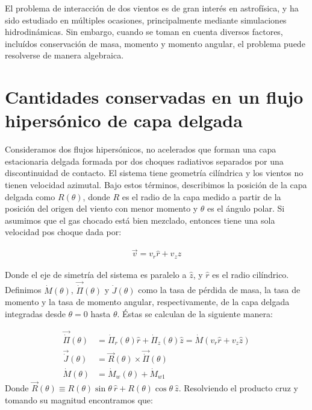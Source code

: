 \label{chap:hipersonica}

El problema de interacción de dos vientos es de gran interés en astrofísica, y
ha sido estudiado en múltiples ocasiones, principalmente mediante simulaciones
hidrodinámicas. Sin embargo, cuando se toman en cuenta diversos factores, incluídos
conservación de masa, momento y momento angular, el problema puede resolverse de manera
algebraica.
\section[Conservación]{Cantidades conservadas en un flujo hipersónico de capa delgada}

Consideramos dos flujos hipersónicos, no acelerados que forman una capa estacionaria delgada
formada por dos choques radiativos separados por una discontinuidad de contacto. El sistema
tiene geometría cilíndrica y los vientos no tienen velocidad azimutal. Bajo estos términos,
describimos la posición de la capa delgada como $R(\theta)$, donde $R$ es el radio de la capa
medido a partir de la posición del origen del viento con menor momento y $\theta$ es el ángulo
polar. Si asumimos que el gas chocado está bien mezclado, entonces tiene una sola velocidad
pos choque dada por:

\begin{align}
  \vec{v} = v_r \hat{r} + v_z \hat{z}
\end{align}

Donde el eje de simetría del sistema es paralelo a $\hat{z}$, y $\hat{r}$ es el radio cilíndrico.
Definimos $\dot{M}(\theta)$, $\vec{\dot{\Pi}}(\theta)$ y $\dot{J}(\theta)$ como la tasa de pérdida
de masa, la tasa de momento y la tasa de momento angular, respectivamente, de la capa delgada
integradas desde $\theta=0$ hasta $\theta$. Éstas se calculan de la siguiente manera:

\begin{align}
  \vec{\dot{\Pi}}(\theta) &= \dot{\Pi}_r(\theta) \hat{r} + \dot{\Pi}_z(\theta) \hat{z} = \dot{M}\left(
                      v_r \hat{r} + v_z\hat{z}\right) \label{eq:dot-pi}\\
  \vec{\dot{J}}(\theta) &= \vec{R}(\theta) \times \vec{\dot{\Pi}}(\theta)  \\
  \dot{M}(\theta) &= \dot{M}_w(\theta) + \dot{M}_{w1} \label{eq:dot-M}
\end{align}
Donde $\vec{R}(\theta)\equiv R(\theta)\sin\theta~\hat{r} + R(\theta)\cos\theta~\hat{z}$. Resolviendo el producto
cruz y tomando su magnitud encontramos que:

